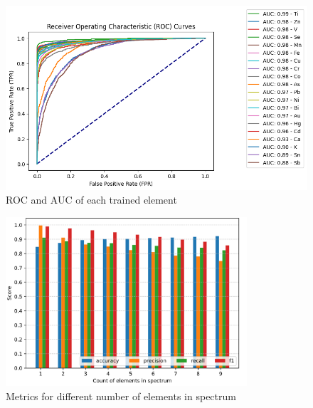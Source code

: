 \begin{figure}[htbp!]
  \centering
  \includegraphics[width=1\textwidth]{img/roc_auc.png}
  \caption{ROC and AUC of each trained element}
  \label{fig:roc-auc}
\end{figure}

\begin{figure}[htbp!]
  \centering
  \includegraphics[width=0.8\textwidth]{img/metrics.png}
  \caption{Metrics for different number of elements in spectrum}
  \label{fig:vit-metrics}
\end{figure}

